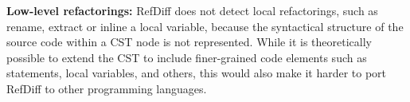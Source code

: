 \textbf{Low-level refactorings:} RefDiff does not detect local refactorings, such as rename, extract or inline a local variable, because the syntactical structure of the source code within a CST node is not represented.
While it is theoretically possible to extend the CST to include finer-grained code elements such as statements, local variables, and others, this would also make it harder to port RefDiff to other programming languages.





